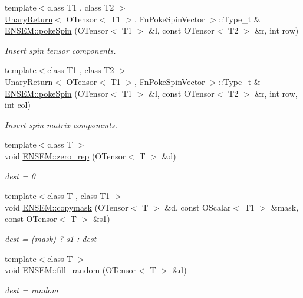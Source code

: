 \begin{DoxyCompactItemize}
{\footnotesize template$<$class T1 , class T2 $>$ }\\\mbox{\hyperlink{structUnaryReturn}{Unary\+Return}}$<$ O\+Tensor$<$ T1 $>$, Fn\+Poke\+Spin\+Vector $>$\+::Type\+\_\+t \& \mbox{\hyperlink{group__obstensor_ga8cc48d37eeb15654e69ed5549844c124}{E\+N\+S\+E\+M\+::poke\+Spin}} (O\+Tensor$<$ T1 $>$ \&l, const O\+Tensor$<$ T2 $>$ \&r, int row)
\begin{DoxyCompactList}\small\item\em Insert spin tensor components. \end{DoxyCompactList}\item 
{\footnotesize template$<$class T1 , class T2 $>$ }\\\mbox{\hyperlink{structUnaryReturn}{Unary\+Return}}$<$ O\+Tensor$<$ T1 $>$, Fn\+Poke\+Spin\+Vector $>$\+::Type\+\_\+t \& \mbox{\hyperlink{group__obstensor_ga2d8623a3d55d368dba3e7b2e1418b6a1}{E\+N\+S\+E\+M\+::poke\+Spin}} (O\+Tensor$<$ T1 $>$ \&l, const O\+Tensor$<$ T2 $>$ \&r, int row, int col)
\begin{DoxyCompactList}\small\item\em Insert spin matrix components. \end{DoxyCompactList}\item 
{\footnotesize template$<$class T $>$ }\\void \mbox{\hyperlink{group__obstensor_gaf56968b79ae090632d1e778d827ac0dd}{E\+N\+S\+E\+M\+::zero\+\_\+rep}} (O\+Tensor$<$ T $>$ \&d)
\begin{DoxyCompactList}\small\item\em dest = 0 \end{DoxyCompactList}\item 
{\footnotesize template$<$class T , class T1 $>$ }\\void \mbox{\hyperlink{group__obstensor_gaec447bbfae019c25fe1906a76108bff8}{E\+N\+S\+E\+M\+::copymask}} (O\+Tensor$<$ T $>$ \&d, const O\+Scalar$<$ T1 $>$ \&mask, const O\+Tensor$<$ T $>$ \&s1)
\begin{DoxyCompactList}\small\item\em dest = (mask) ? s1 \+: dest \end{DoxyCompactList}\item 
{\footnotesize template$<$class T $>$ }\\void \mbox{\hyperlink{group__obstensor_ga7d63bb40d886b853e075aec1dea0a717}{E\+N\+S\+E\+M\+::fill\+\_\+random}} (O\+Tensor$<$ T $>$ \&d)
\begin{DoxyCompactList}\small\item\em dest = random \end{DoxyCompactList}\item 

\end{DoxyCompactItemize}
